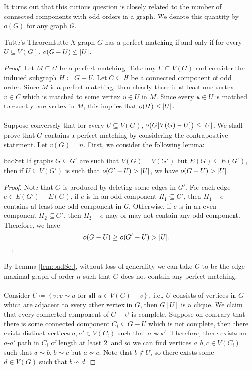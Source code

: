 \documentclass[math, code]{amznotes}
\theoremstyle{remark}
\begin{document}
It turns out that this curious question is closely related to the number of connected components with odd orders in a graph. We denote this quantity by $o(G)$ for any graph $G$.
\begin{thmbox}{Tutte's Theorem}{tutte}
    A graph $G$ has a perfect matching if and only if for every $U \subseteq V(G)$, $o(G - U) \leq {\left\lvert {U} \right\rvert}$.
    \tcblower
    \begin{proof}
        Let $M \subseteq G$ be a perfect matching. Take any $U \subseteq V(G)$ and consider the induced subgraph $H \coloneqq G - U$. Let $C \subseteq H$ be a connected component of odd order. Since $M$ is a perfect matching, then clearly there is at least one vertex $v \in C$ which is matched to some vertex $u \in U$ in $M$. Since every $u \in U$ is matched to exactly one vertex in $M$, this implies that $o(H) \leq {\left\lvert {U} \right\rvert}$.
        \\\\
        Suppose conversely that for every $U \subseteq V(G)$, $o\bigl(G[V(G) - U]\bigr) \leq {\left\lvert {U} \right\rvert}$. We shall prove that $G$ contains a perfect matching by considering the contrapositive statement. Let $v(G) = n$. First, we consider the following lemma:
        \begin{lembox}{}{badSet}
            If graphs $G \subseteq G'$ are such that $V(G) = V(G')$ but $E(G) \subseteq E(G')$, then if $U \subseteq V(G')$ is such that $o(G' - U) > {\left\lvert {U} \right\rvert}$, we have $o(G - U) > {\left\lvert {U} \right\rvert}$.
            \tcblower
            \begin{proof}
                Note that $G$ is produced by deleting some edges in $G'$. For each edge $e \in E(G') - E(G)$, if $e$ is in an odd component $H_1 \subseteq G'$, then $H_1 - e$ contains at least one odd component in $G$. Otherwise, if $e$ is in an even component $H_2 \subseteq G'$, then $H_2 - e$ may or may not contain any odd component. Therefore, we have
                \begin{equation*}
                    o(G - U) \geq o(G' - U) > {\left\lvert {U} \right\rvert}.
                \end{equation*}  
            \end{proof}
        \end{lembox}
        By Lemma \ref{lem:badSet}, without loss of generality we can take $G$ to be the edge-maximal graph of order $n$ such that $G$ does not contain any perfect matching. 
        \\\\
        Consider $U \coloneqq \left\{v \colon v \sim u \textrm{ for all } u \in V(G) - v\right\}$, i.e., $U$ consists of vertices in $G$ which are adjacent to every other vertex in $G$, then $G[U]$ is a clique. We claim that every connected component of $G - U$ is complete. Suppose on contrary that there is some connected component $C_i \subseteq G - U$ which is not complete, then there exists distinct vertices $a, a' \in V(C_i)$ such that $a \not\sim a'$. Therefore, there exists an $a$-$a'$ path in $C_i$ of length at least $2$, and so we can find vertices $a, b, c \in V(C_i)$ such that $a \sim b$, $b \sim c$ but $a \not\sim c$. Note that $b \notin U$, so there exists some $d \in V(G)$ such that $b \not\sim d$.

\end{proof}
\end{thmbox}
\end{document}

